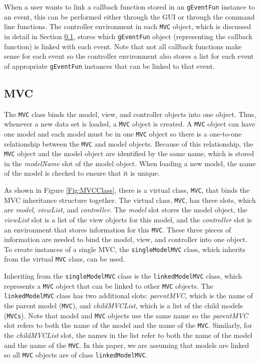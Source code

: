 \documentclass{article}[11pt]
\newcommand{\Robject}[1]{{\texttt{#1}}}
\newcommand{\Rslot}[1]{\textsl{#1}}
\newcommand{\Rclass}[1]{\texttt{#1}}
\begin{document}
When a user wants to link a callback function stored in an \Robject{gEventFun}
instance to an event, this can be performed either through the GUI or through
the command line functions.  The controller environment in each \Robject{MVC}
object, which is discussed in detail in Section \ref{Ssec:OneMVC},
stores which \Robject{gEventFun} object (representing the callback
function) is linked with each event.  Note that not all callback functions
make sense for each event so the controller environment also stores a list
for each event of appropriate \Robject{gEventFun} instances that can be linked
to that event.

\subsection{MVC}\label{Ssec:OneMVC}
 
The \Rclass{MVC} class binds the model, view, and
controller objects into one object.  Thus, whenever a new data set
is loaded, a \Robject{MVC} object is created.  A \Robject{MVC} object can have
one model and each model must be in one \Robject{MVC}
object so there is a one-to-one relationship between the \Robject{MVC} and
model objects.  Because of this relationship, the \Robject{MVC}
object and the model object are identified by the same name, which
is stored in the \Rslot{modelName} slot of the model object.  When
loading a new model, the name of the model is checked to
ensure that it is unique.

As shown in Figure \ref{Fig:MVCClass}, there is a virtual class, \Rclass{MVC},
that binds the MVC inheritance structure together.  The virtual class,
\Rclass{MVC}, has three slots, which are \Rslot{model}, \Rslot{viewList}, and
\Rslot{controller}.  The \Rslot{model} slot stores the model object, the
\Rslot{viewList} slot is a list of the view objects for this model, and the
\Rslot{controller} slot is an environment that stores information for this
\Robject{MVC}.  These three pieces of information are needed to bind the
model, view, and controller into one object.  To create instances of a single
MVC, the \Rclass{singleModelMVC} class, which inherits from the virtual
\Rclass{MVC} class, can be used.  

Inheriting from the \Rclass{singleModelMVC} class is the
\Rclass{linkedModelMVC} class, which represents a \Robject{MVC} object that
can be linked to other \Robject{MVC} objects.  The \Rclass{linkedModelMVC}
class has two additional slots: \Rslot{parentMVC}, which is the name of the
parent model (\Robject{MVC}), and \Rslot{childMVCList}, which is a list of the
child models (\Robject{MVCs}).  Note that model and
\Robject{MVC} objects use the same name so the \Rslot{parentMVC} slot refers
to both the name of the model and the name of the \Robject{MVC}.
Similarly, for the \Rslot{childMVCList} slot, the names in the list refer to
both the name of the model and the name of the \Robject{MVC}.  In this paper,
we are assuming that models are linked so all \Robject{MVC} objects are of
class \Rclass{linkedModelMVC}.
\end{document}
